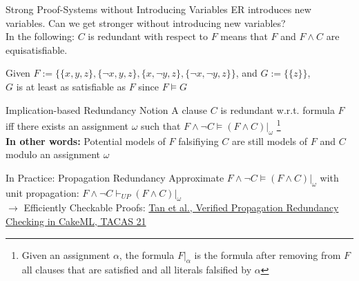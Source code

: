 \documentclass[t]{sdqbeamer}
\begin{document}
\begin{frame}{Strong Proof-Systems without Introducing Variables}
\vspace*{-1em}
ER introduces new variables. Can we get stronger without introducing new variables?\\
In the following: $C$ is redundant with respect to $F$ means that $F$ and $F \land C$ are equisatisfiable.
\begin{example}
Given $F := \{\{x, y, z\}, \{\lnot x, y, z\}, \{x, \lnot y, z\}, \{\lnot x, \lnot y, z\}\}$, and $G := \{\{z\}\}$, \\
$G$ is at least as satisfiable as $F$ since $F \models G$
\end{example}
\pause
\begin{block}{Implication-based Redundancy Notion}
A clause $C$ is redundant w.r.t. formula $F$ iff there exists an assignment $\omega$ such that $F \land \lnot C \models (F \land C)|_\omega$%
\footnote{Given an assignment $\alpha$, the formula $F|_\alpha$ is the formula after removing from $F$ all clauses that are satisfied and all literals falsified by $\alpha$}
~\\[1ex]
\textbf{In other words:} Potential models of $F$ falsifiying $C$ are still models of $F$ and $C$ modulo an assignment $\omega$
\end{block}
\pause
\begin{block}{In Practice: Propagation Redundancy}
Approximate $F \land \lnot C \models (F \land C)|_\omega$ with unit propagation: $F \land \lnot C \vdash_{UP} (F \land C)|_\omega$\\
$\rightarrow$ Efficiently Checkable Proofs: \href{https://cakeml.org/tacas21.pdf}{Tan et al., Verified Propagation Redundancy Checking in CakeML, TACAS 21}
\end{block}
\end{frame}
\end{document}

